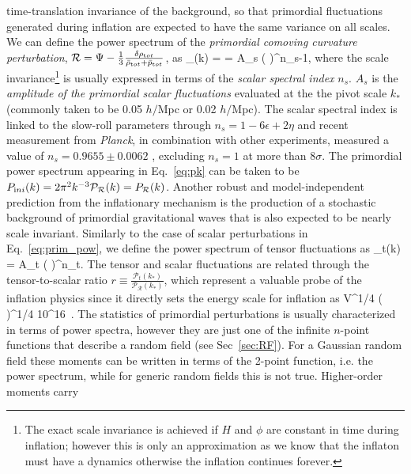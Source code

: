time-translation invariance of the background, so that primordial fluctuations generated during inflation are 
expected to have the same variance on all scales. We can define the power 
spectrum of the \emph{ primordial comoving curvature perturbation}, $\mathcal{R} = \Psi - \frac{1}{3} \frac{\delta\rho_{\rm tot}}{\bar{\rho}_{\rm tot} + \bar{p}_{\rm tot}}$, as
%
\be
\label{eq:prim_pow}
_{}(k) =  = A_s \biggl(  \biggr)^{n_s-1},
\ee
%
where the scale invariance\footnote{The exact scale invariance is achieved if $H$ and $\phi$ are constant
in time during inflation; however this is only an approximation as we know that the inflaton must have a 
dynamics otherwise the inflation continues forever.} is usually expressed in terms of the \emph{scalar 
spectral index} $n_s$. $A_s$ is the \emph{amplitude of the primordial scalar fluctuations} evaluated
at the the pivot scale $k_*$ (commonly taken to be 0.05 $h/$Mpc or 0.02 $h/$Mpc).
The scalar spectral index is linked to the slow-roll parameters through $n_s = 1 - 6\epsilon + 2\eta$ and
recent measurement from \textit{Planck}, in combination with other experiments, measured a value of
$n_s = 0.9655 \pm 0.0062$ \citep{PlanckCollaboration2015b}, excluding $n_s =1 $ at more than 
$8\sigma$. The primordial power spectrum appearing in Eq.~\eqref{eq:pk} can be taken to be $P_{\rm ini}(k)=2\pi^2k^{-3}\mathcal{P}_{\mathcal{R}}(k) = P_{\mathcal{R}}(k)$. 
 Another robust and model-independent 
prediction from the inflationary mechanism is the production of a stochastic background of primordial
gravitational waves that is also expected to be nearly scale invariant. Similarly to the case of scalar 
perturbations in Eq.~\eqref{eq:prim_pow}, we define the power spectrum of tensor fluctuations as 
%
\be
{}_t(k) = A_t \biggl(  \biggr)^{n_t}.
\ee
%
The tensor and scalar fluctuations are related through the tensor-to-scalar ratio 
$r \equiv \frac{\mathcal{P}_t(k_*)}{\mathcal{P}_{\mathcal{R}}(k_*)}$, which represent a valuable probe
of the inflation physics since it directly sets the energy scale for inflation as
%
\be
V^{1/4} \approx \Bigl (  \Bigr )^{1/4} 10^{16}\, . 
\ee
%
The statistics of primordial perturbations is usually characterized in terms of power spectra, however 
they are just one of the infinite $n$-point functions that describe a random field (see Sec~\eqref{sec:RF}). 
For a Gaussian random field these moments can be written in terms of the 2-point function, i.e. the power
spectrum, while for generic random fields this is not true. Higher-order moments carry 
